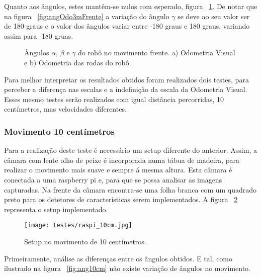 Quanto aos ângulos, estes mantêm-se nulos com esperado,  figura ~\ref{fig:ang3mFrente}. De notar que na figura ~\ref{fig:angOdo3mFrente} a variação do ângulo $\gamma$ se deve ao seu valor ser de 180 graus e o valor dos ângulos variar entre -180 graus e 180 graus, variando assim para -180 gruas.

\begin{figure}[h!]
	\centering
	\qquad
	\caption{Ângulos $\alpha$, $\beta$ e $\gamma$ do robô no movimento frente. a) Odometria Visual e b) Odometria das rodas do robô.}
	\label{fig:ang3mFrente}
\end{figure}

Para melhor interpretar os resultados obtidos foram realizados dois testes, para perceber a diferença nas escalas e a indefinição da escala da Odometria Visual. Esses mesmo testes serão realizados com igual distância percorridas, 10 centímetros, mas velocidades diferentes.


\subsubsection{Movimento 10 centímetros}\label{subcaption:10cm}

Para a realização deste teste é necessário um setup diferente do anterior. Assim, a câmara com lente olho de peixe é incorporada numa tábua de madeira, para realizar o movimento mais suave e sempre á mesma altura. Esta câmara é conectada a uma raspberry pi e, para que se possa  analisar as imagens capturadas. Na frente da câmara encontra-se uma folha branca com um quadrado preto para os detetores de características serem implementados. A figura ~\ref{fig:setup10cm} representa o setup implementado.

\begin{figure}[h!]
	\begin{center}
		\leavevmode		
		\texttt{[image: testes/raspi\_10cm.jpg]}
		\caption{Setup no movimento de 10 centímetros.}
		\label{fig:setup10cm}
	\end{center}
\end{figure}
 


Primeiramente, análise as diferenças  entre os ângulos obtidos. E tal, como ilustrado na figura ~\ref{fig:ang10cm} não existe variação de ângulos no movimento.

